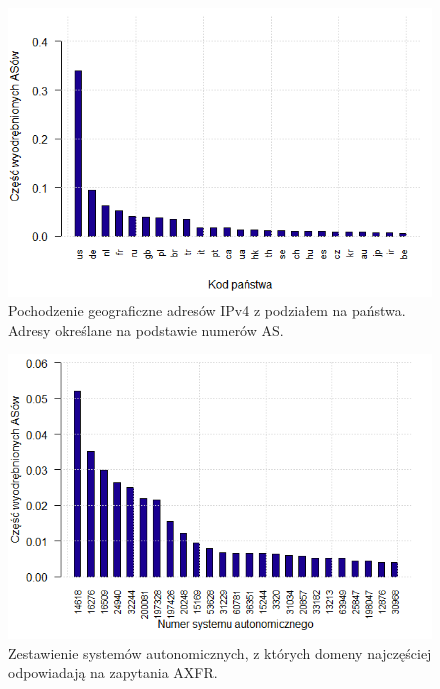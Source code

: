\begin{figure}[h]
	\centering
	\includegraphics[width=1.0\textwidth]{image/ipv4_as_countries_no_title}
	\caption{Pochodzenie geograficzne adresów IPv4 z podziałem na państwa. Adresy określane na podstawie numerów AS.}
	\label{fig:ipv4_countries}
\end{figure}

\begin{figure}[h]
	\centering
	\includegraphics[width=1.0\textwidth]{image/asn_all_no_title}
	\caption{Zestawienie systemów autonomicznych, z których domeny najczęściej odpowiadają na zapytania AXFR.}
	\label{fig:asn_all}
\end{figure}

